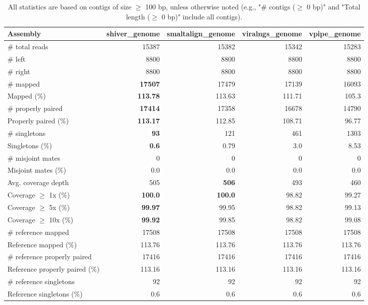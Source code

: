 \documentclass[12pt,a4paper]{article}
\begin{document}
\begin{table}[ht]
\begin{center}
\caption{All statistics are based on contigs of size $\geq$ 100 bp, unless otherwise noted (e.g., "\# contigs ($\geq$ 0 bp)" and "Total length ($\geq$ 0 bp)" include all contigs).}
\begin{tabular}{|l*{4}{|r}|}
\hline
Assembly & shiver\_genome & smaltalign\_genome & viralngs\_genome & vpipe\_genome \\ \hline
\# total reads & 15387 & 15382 & 15342 & 15283 \\ \hline
\# left & 8800 & 8800 & 8800 & 8800 \\ \hline
\# right & 8800 & 8800 & 8800 & 8800 \\ \hline
\# mapped & {\bf 17507} & 17479 & 17139 & 16093 \\ \hline
Mapped (\%) & {\bf 113.78} & 113.63 & 111.71 & 105.3 \\ \hline
\# properly paired & {\bf 17414} & 17358 & 16678 & 14790 \\ \hline
Properly paired (\%) & {\bf 113.17} & 112.85 & 108.71 & 96.77 \\ \hline
\# singletons & {\bf 93} & 121 & 461 & 1303 \\ \hline
Singletons (\%) & {\bf 0.6} & 0.79 & 3.0 & 8.53 \\ \hline
\# misjoint mates & 0 & 0 & 0 & 0 \\ \hline
Misjoint mates (\%) & 0.0 & 0.0 & 0.0 & 0.0 \\ \hline
Avg. coverage depth & 505 & {\bf 506} & 493 & 460 \\ \hline
Coverage $\geq$ 1x (\%) & {\bf 100.0} & {\bf 100.0} & 98.82 & 99.27 \\ \hline
Coverage $\geq$ 5x (\%) & {\bf 99.97} & 99.95 & 98.82 & 99.13 \\ \hline
Coverage $\geq$ 10x (\%) & {\bf 99.92} & 99.85 & 98.82 & 99.08 \\ \hline
\# reference mapped & 17508 & 17508 & 17508 & 17508 \\ \hline
Reference mapped (\%) & 113.76 & 113.76 & 113.76 & 113.76 \\ \hline
\# reference properly paired & 17416 & 17416 & 17416 & 17416 \\ \hline
Reference properly paired (\%) & 113.16 & 113.16 & 113.16 & 113.16 \\ \hline
\# reference singletons & 92 & 92 & 92 & 92 \\ \hline
Reference singletons (\%) & 0.6 & 0.6 & 0.6 & 0.6 \\ \hline

\end{tabular}
\end{center}
\end{table}
\end{document}
